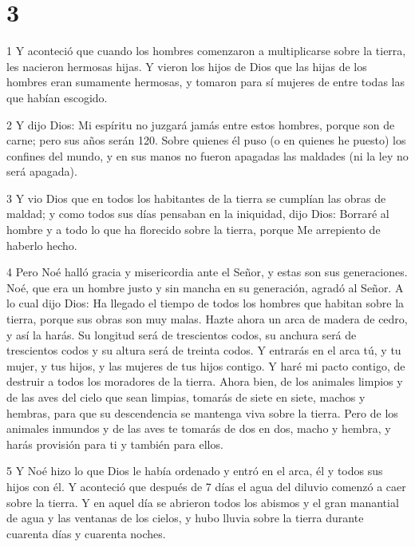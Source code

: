 \chapter{3}

\par 1 Y aconteció que cuando los hombres comenzaron a multiplicarse sobre la tierra, les nacieron hermosas hijas. Y vieron los hijos de Dios que las hijas de los hombres eran sumamente hermosas, y tomaron para sí mujeres de entre todas las que habían escogido.

\par 2 Y dijo Dios: Mi espíritu no juzgará jamás entre estos hombres, porque son de carne; pero sus años serán 120. Sobre quienes él puso (o en quienes he puesto) los confines del mundo, y en sus manos no fueron apagadas las maldades (ni la ley no será apagada).

\par 3 Y vio Dios que en todos los habitantes de la tierra se cumplían las obras de maldad; y como todos sus días pensaban en la iniquidad, dijo Dios: Borraré al hombre y a todo lo que ha florecido sobre la tierra, porque Me arrepiento de haberlo hecho.

\par 4 Pero Noé halló gracia y misericordia ante el Señor, y estas son sus generaciones. Noé, que era un hombre justo y sin mancha en su generación, agradó al Señor. A lo cual dijo Dios: Ha llegado el tiempo de todos los hombres que habitan sobre la tierra, porque sus obras son muy malas. Hazte ahora un arca de madera de cedro, y así la harás. Su longitud será de trescientos codos, su anchura será de trescientos codos y su altura será de treinta codos. Y entrarás en el arca tú, y tu mujer, y tus hijos, y las mujeres de tus hijos contigo. Y haré mi pacto contigo, de destruir a todos los moradores de la tierra. Ahora bien, de los animales limpios y de las aves del cielo que sean limpias, tomarás de siete en siete, machos y hembras, para que su descendencia se mantenga viva sobre la tierra. Pero de los animales inmundos y de las aves te tomarás de dos en dos, macho y hembra, y harás provisión para ti y también para ellos.

\par 5 Y Noé hizo lo que Dios le había ordenado y entró en el arca, él y todos sus hijos con él. Y aconteció que después de 7 días el agua del diluvio comenzó a caer sobre la tierra. Y en aquel día se abrieron todos los abismos y el gran manantial de agua y las ventanas de los cielos, y hubo lluvia sobre la tierra durante cuarenta días y cuarenta noches.

